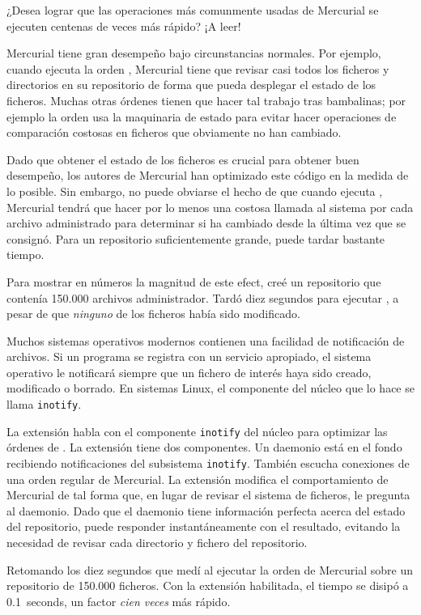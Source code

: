 ¿Desea lograr que las operaciones más comunmente usadas de Mercurial se
ejecuten centenas de veces más rápido? ¡A leer!

Mercurial tiene gran desempeño bajo circunstancias normales.  Por
ejemplo, cuando ejecuta la orden , Mercurial tiene que
revisar casi todos los ficheros y directorios en su repositorio de
forma que pueda desplegar el estado de los ficheros.  Muchas otras
órdenes tienen que hacer tal trabajo tras bambalinas;  por ejemplo la
orden  usa la maquinaria de estado para evitar hacer
operaciones de comparación costosas en ficheros que obviamente no han
cambiado.

Dado que obtener el estado de los ficheros es crucial para obtener
buen desempeño, los autores de Mercurial han optimizado este código en
la medida de lo posible.  Sin embargo, no puede obviarse el hecho de
que cuando ejecuta , Mercurial tendrá que hacer por lo
menos una costosa llamada al sistema por cada archivo administrado
para determinar si ha cambiado desde la última vez que se consignó.
Para un repositorio suficientemente grande, puede tardar bastante
tiempo.

Para mostrar en números la magnitud de este efect, creé un repositorio
que contenía 150.000 archivos administrador.  Tardó diez segundos para
ejecutar , a pesar de que \emph{ninguno} de los ficheros
había sido modificado.

Muchos sistemas operativos modernos contienen una facilidad de
notificación de archivos.  Si un programa se registra con un servicio
apropiado, el sistema operativo le notificará siempre que un fichero
de interés haya sido creado, modificado o borrado.  En sistemas Linux,
el componente del núcleo que lo hace se llama \texttt{inotify}.

La extensión  habla con el componente \texttt{inotify}
del núcleo para optimizar las órdenes de .  La extensión
tiene dos componentes.  Un daemonio está en el fondo recibiendo
notificaciones del subsistema \texttt{inotify}.  También escucha
conexiones de una orden regular de Mercurial.  La extensión modifica
el comportamiento de Mercurial de tal forma que, en lugar de revisar
el sistema de ficheros, le pregunta al daemonio.  Dado que el daemonio
tiene información perfecta acerca del estado del repositorio, puede
responder instantáneamente con el resultado, evitando la necesidad de
revisar cada directorio y fichero del repositorio.

Retomando los diez segundos que medí al ejecutar la orden
 de Mercurial sobre un repositorio de 150.000
ficheros. Con la extensión  habilitada, el tiempo se
disipó a 0.1~seconds, un factor \emph{cien veces} más rápido.

